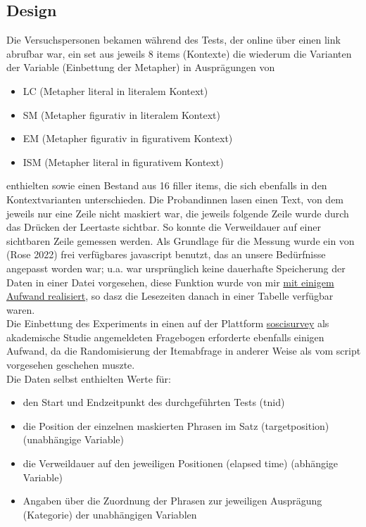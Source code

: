 \documentclass[
]{article}
\providecommand{\tightlist}{%
  \setlength{\itemsep}{0pt}\setlength{\parskip}{0pt}}
\begin{document}
\hypertarget{design}{%
\subsection{Design}\label{design}}

Die Versuchspersonen bekamen während des Tests, der online über einen link abrufbar war, ein set aus jeweils 8 items (Kontexte) die wiederum die Varianten der Variable (Einbettung der Metapher) in Ausprägungen von

\begin{itemize}
\tightlist
\item
  LC (Metapher literal in literalem Kontext)\\
\item
  SM (Metapher figurativ in literalem Kontext)\\
\item
  EM (Metapher figurativ in figurativem Kontext)\\
\item
  ISM (Metapher literal in figurativem Kontext)
\end{itemize}

enthielten sowie einen Bestand aus 16 filler items, die sich ebenfalls in den Kontextvarianten unterschieden. Die Probandinnen lasen einen Text, von dem jeweils nur eine Zeile nicht maskiert war, die jeweils folgende Zeile wurde durch das Drücken der Leertaste sichtbar. So konnte die Verweildauer auf einer sichtbaren Zeile gemessen werden. Als Grundlage für die Messung wurde ein von (Rose 2022) frei verfügbares javascript benutzt, das an unsere Bedürfnisse angepasst worden war; u.a. war ursprünglich keine dauerhafte Speicherung der Daten in einer Datei vorgesehen, diese Funktion wurde von mir \href{https://github.com/esteeschwarz/essais/tree/main/docs/hux2021/experiment/JESPR_original\%26modified}{mit einigem Aufwand realisiert}, so dasz die Lesezeiten danach in einer Tabelle verfügbar waren.\\
Die Einbettung des Experiments in einen auf der Plattform \href{https://soscisurvey.de}{soscisurvey} als akademische Studie angemeldeten Fragebogen erforderte ebenfalls einigen Aufwand, da die Randomisierung der Itemabfrage in anderer Weise als vom script vorgesehen geschehen muszte.\\
Die Daten selbst enthielten Werte für:

\begin{itemize}
\tightlist
\item
  den Start und Endzeitpunkt des durchgeführten Tests (tnid)\\
\item
  die Position der einzelnen maskierten Phrasen im Satz (targetposition) (unabhängige Variable)\\
\item
  die Verweildauer auf den jeweiligen Positionen (elapsed time) (abhängige Variable)\\
\item
  Angaben über die Zuordnung der Phrasen zur jeweiligen Ausprägung (Kategorie) der unabhängigen Variablen
\end{itemize}
\end{document}
